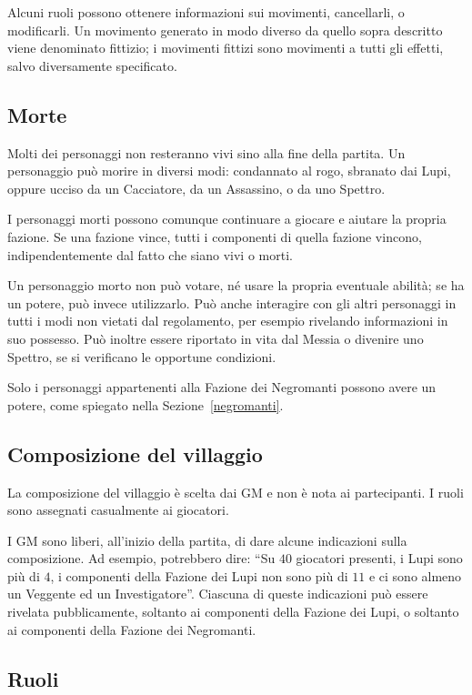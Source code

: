 \documentclass[a4paper,10pt]{article}
\begin{document}
Alcuni ruoli possono ottenere informazioni sui movimenti, cancellarli, o modificarli. Un movimento generato in modo diverso da quello sopra descritto viene denominato fittizio; i movimenti fittizi sono movimenti a tutti gli effetti, salvo diversamente specificato.

\subsection{Morte}

Molti dei personaggi non resteranno vivi sino alla fine della partita. Un personaggio può morire in diversi modi: condannato al rogo, sbranato dai Lupi, oppure ucciso da un Cacciatore, da un Assassino, o da uno Spettro.

I personaggi morti possono comunque continuare a giocare e aiutare la propria fazione. Se una fazione vince, tutti i componenti di quella fazione vincono, indipendentemente dal fatto che siano vivi o morti.

Un personaggio morto non può votare, né usare la propria eventuale abilità; se ha un potere, può invece utilizzarlo. Può anche interagire con gli altri personaggi in tutti i modi non vietati dal regolamento, per esempio rivelando informazioni in suo possesso. Può inoltre essere riportato in vita dal Messia o divenire uno Spettro, se si verificano le opportune condizioni.

Solo i personaggi appartenenti alla Fazione dei Negromanti possono avere un potere, come spiegato nella Sezione~\ref{negromanti}.

\subsection{Composizione del villaggio}
 
La composizione del villaggio è scelta dai GM e non è nota ai partecipanti. I ruoli sono assegnati casualmente ai giocatori.

I GM sono liberi, all'inizio della partita, di dare alcune indicazioni sulla composizione. Ad esempio, potrebbero dire: ``Su $40$ giocatori presenti, i Lupi sono più di $4$, i componenti della Fazione dei Lupi non sono più di $11$ e ci sono almeno un Veggente ed un Investigatore''. Ciascuna di queste indicazioni può essere rivelata pubblicamente, soltanto ai componenti della Fazione dei Lupi, o soltanto ai componenti della Fazione dei Negromanti.

\subsection{Ruoli}
\label{ruoli}
\end{document}
